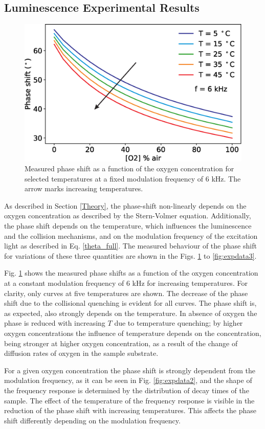 \documentclass[9pt,twocolumn,twoside,pdftex]{optica}
\begin{document}
\subsection{Luminescence Experimental Results}

\begin{figure}[]
\centering
\includegraphics[width=8.2 cm]{phase_O2_T.eps}
\caption{Measured phase shift as a function of the oxygen concentration for selected temperatures at a fixed modulation frequency of 6 kHz. The arrow marks increasing temperatures.}
\label{fig:expdata1}
\end{figure}

As described in Section \ref{Theory}, the phase-shift non-linearly depends on the oxygen concentration as described by the Stern-Volmer equation. Additionally, the phase shift depends on the temperature, which influences the luminescence and the collision mechanisms, and on the modulation frequency of the excitation light as described in Eq. \ref{theta_full}. The measured behaviour of the phase shift for variations of these three quantities are shown in the Figs. \ref{fig:expdata1} to \ref{fig:expdata3}.

Fig. \ref{fig:expdata1} shows the measured phase shifts as a function of the oxygen concentration at a constant modulation frequency of 6 kHz for increasing temperatures. For clarity, only curves at five temperatures are shown. The decrease of the phase shift due to the collisional quenching is evident for all curves. The phase shift is, as expected, also strongly depends on the temperature. In absence of oxygen the phase is reduced with increasing $T$ due to temperature quenching; by higher oxygen concentrations the influence of temperature depends on the concentration, being stronger at higher oxygen concentration, as a result of the change of diffusion rates of oxygen in the sample substrate.

For a given oxygen concentration the phase shift is strongly dependent from the modulation frequency, as it can be seen in Fig. \ref{fig:expdata2}, and the shape of the frequency response is determined by the distribution of decay times of the sample. The effect of the temperature of the frequency response is visible in the reduction of the phase shift with increasing temperatures. This affects the phase shift differently depending on the modulation frequency. 
\end{document}
